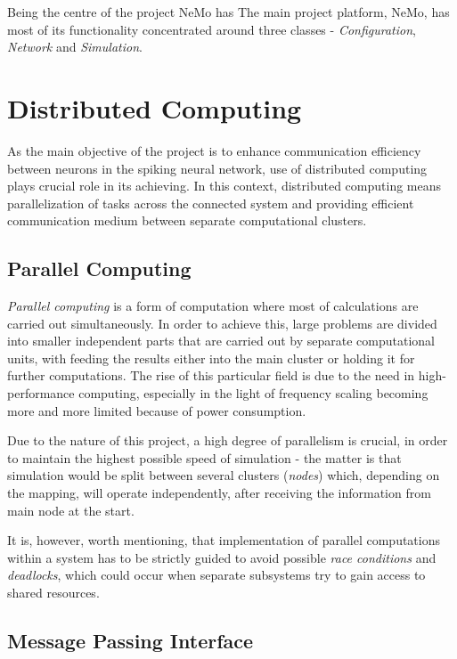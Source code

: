Being the centre of the project NeMo has 
The main project platform, NeMo, has most of its functionality concentrated around three classes - \emph{Configuration}, \emph{Network} and \emph{Simulation}.


\section{Distributed Computing}

As the main objective of the project is to enhance communication efficiency between neurons in the spiking neural network, use of distributed computing plays crucial
role in its achieving. In this context, distributed computing means parallelization of tasks across the connected system and providing efficient communication medium
between separate computational clusters.

\subsection{Parallel Computing}

\emph{Parallel computing} is a form of computation where most of calculations are carried out simultaneously.\cite{G.S.Almasi1989} In order to achieve this, large problems
are divided into smaller independent parts that are carried out by separate computational units, with feeding the results either into the main cluster or holding it for further
computations. The rise of this particular field is due to the need in high-performance computing, especially in the light of frequency scaling becoming more and more
limited because of power consumption.\cite{Kumar2002}

Due to the nature of this project, a high degree of parallelism is crucial, in order to maintain the highest possible speed of simulation - the matter is that simulation would
be split between several clusters (\emph{nodes}) which, depending on the mapping, will operate independently, after receiving the information from main node at the start.

It is, however, worth mentioning, that implementation of parallel computations within a system has to be strictly guided to avoid possible \emph{race conditions} and \emph{deadlocks}, which
could occur when separate subsystems try to gain access to shared resources.

\subsection{Message Passing Interface}

